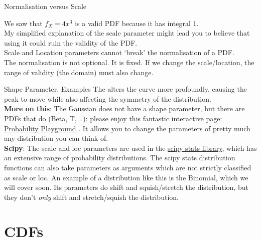 \documentclass[10pt,sans,english,compress,table,xcolor=dvipsnames]{beamer}
\begin{document}
\begin{frame}[fragile]{Normalisation versus Scale}

We saw that $f_X = 4x^3$ is a valid PDF because it has integral 1.\\[1ex]

My simplified explanation of the scale parameter might lead you to believe that using it could ruin the validity of the PDF.\\[1ex]

Scale and Location parameters cannot `break' the normalisation of a PDF.\\[1ex]

The normalisation is not optional. It is fixed. If we change the scale/location, the range of validity (the domain) must also change.\\[1ex]

\end{frame}



\begin{frame}[fragile]{Shape Parameter, Examples}
The  alters the curve more profoundly, causing the peak to move while also affecting the symmetry of the distribution. \\[1ex]

\small
\textbf{More on this}: The Gaussian does not have a shape parameter, but there are PDFs that do (Beta, T, ..): please enjoy this fantastic interactive page: \href{https://www.acsu.buffalo.edu/~adamcunn/probability/normal.html}{Probability Playground} . It allows you to change the parameters of pretty much any distribution you can think of. \\[1ex]

\textbf{Scipy}: The scale and loc parameters are used in the \href{https://docs.scipy.org/doc/scipy/reference/stats.html}{scipy stats library}, which has an extensive range of probability distributions. The scipy stats distribution functions can also take parameters as arguments which are not strictly classified as scale or loc. An example of a distribution like this is the Binomial, which we will cover soon. Its parameters do shift and squish/stretch the distribution, but they don't \textit{only} shift and stretch/squish the distribution.

\end{frame}



\section*{CDFs}
\end{document}
